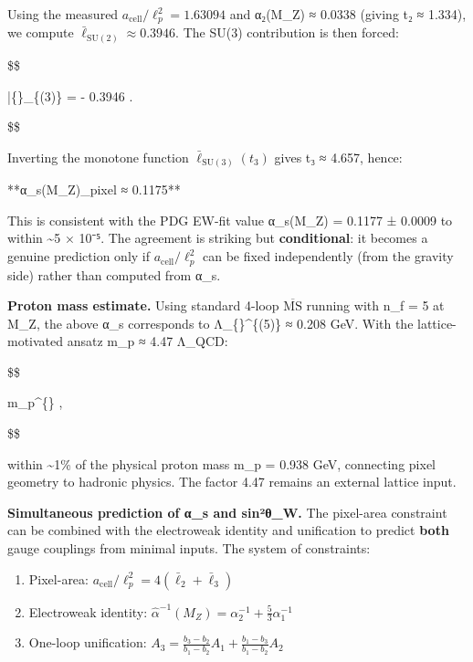 \documentclass[11pt,a4paper]{article}
\theoremstyle{remark}
\providecommand{\tightlist}{%
  \setlength{\itemsep}{0pt}\setlength{\parskip}{0pt}}
\begin{document}
Using the measured \(a_{\mathrm{cell}}/\ell_p^2 = 1.63094\) and α₂(M\_Z) ≈ 0.0338
(giving t₂ ≈ 1.334), we compute \(\bar{\ell}_{\mathrm{SU}(2)} ≈ 0.3946\). The
SU(3) contribution is then forced:

\$\$

\bar\{\ell\}\_\{(3)\} =  - 0.3946 .

\$\$

Inverting the monotone function \(\bar{\ell}_{\mathrm{SU}(3)}(t_3)\) gives
t₃ ≈ 4.657, hence:

**α\_s(M\_Z)\textbar\_pixel ≈ 0.1175**

This is consistent with the PDG EW-fit value α\_s(M\_Z) = 0.1177 ± 0.0009 to within
\textasciitilde5 × 10⁻⁵. The agreement is striking but \textbf{conditional}: it becomes a
genuine prediction only if \(a_{\mathrm{cell}}/\ell_p^2\) can be fixed
independently (from the gravity side) rather than computed from α\_s.

\textbf{Proton mass estimate.} Using standard 4-loop \(\overline{\mathrm{MS}}\) running
with n\_f = 5 at M\_Z, the above α\_s corresponds to
Λ\_\{\}\^{}\{(5)\} ≈ 0.208 GeV. With the lattice-motivated ansatz
m\_p ≈ 4.47 Λ\_QCD:

\$\$

m\_p\^{}\{\}    ,

\$\$

within \textasciitilde1\% of the physical proton mass m\_p = 0.938 GeV, connecting pixel
geometry to hadronic physics. The factor 4.47 remains an external lattice input.

\textbf{Simultaneous prediction of α\_s and sin²θ\_W.} The pixel-area constraint can
be combined with the electroweak identity and unification to predict \textbf{both}
gauge couplings from minimal inputs. The system of constraints:

\begin{enumerate}
\def\labelenumi{\arabic{enumi}.}
\tightlist
\item
  Pixel-area: \(a_{\mathrm{cell}}/\ell_p^2 = 4(\bar{\ell}_2 + \bar{\ell}_3)\)
\item
  Electroweak identity: \(\hat{\alpha}^{-1}(M_Z) = \alpha_2^{-1} + \frac{5}{3}\alpha_1^{-1}\)
\item
  One-loop unification: \(A_3 = \frac{b_3-b_2}{b_1-b_2}A_1 + \frac{b_1-b_3}{b_1-b_2}A_2\)
\end{enumerate}
\end{document}
